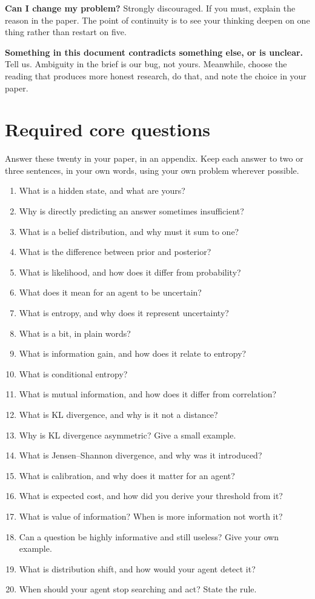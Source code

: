 \documentclass[11pt,a4paper]{article}
\begin{document}
\textbf{Can I change my problem?} Strongly discouraged. If you must, explain the reason in the
paper. The point of continuity is to see your thinking deepen on one thing rather than restart
on five.

\textbf{Something in this document contradicts something else, or is unclear.} Tell us. Ambiguity
in the brief is our bug, not yours. Meanwhile, choose the reading that produces more honest
research, do that, and note the choice in your paper.

\newpage
\appendix
\section{Required core questions}
\label{app:core}

Answer these twenty in your paper, in an appendix. Keep each answer to two or three sentences,
in your own words, using your own problem wherever possible.

\begin{enumerate}[itemsep=2pt]
  \item What is a hidden state, and what are yours?
  \item Why is directly predicting an answer sometimes insufficient?
  \item What is a belief distribution, and why must it sum to one?
  \item What is the difference between prior and posterior?
  \item What is likelihood, and how does it differ from probability?
  \item What does it mean for an agent to be uncertain?
  \item What is entropy, and why does it represent uncertainty?
  \item What is a bit, in plain words?
  \item What is information gain, and how does it relate to entropy?
  \item What is conditional entropy?
  \item What is mutual information, and how does it differ from correlation?
  \item What is KL divergence, and why is it not a distance?
  \item Why is KL divergence asymmetric? Give a small example.
  \item What is Jensen--Shannon divergence, and why was it introduced?
  \item What is calibration, and why does it matter for an agent?
  \item What is expected cost, and how did you derive your threshold from it?
  \item What is value of information? When is more information not worth it?
  \item Can a question be highly informative and still useless? Give your own example.
  \item What is distribution shift, and how would your agent detect it?
  \item When should your agent stop searching and act? State the rule.
\end{enumerate}
\end{document}

